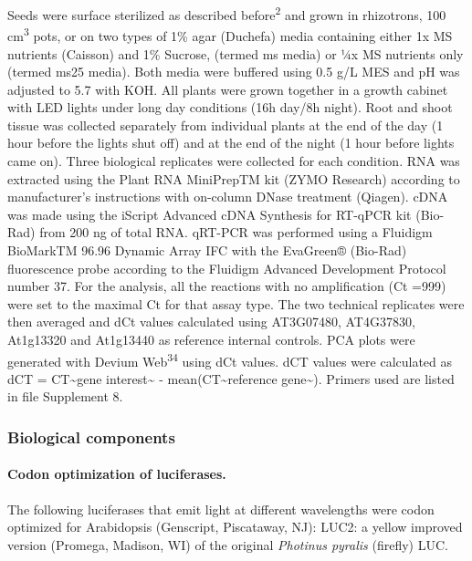 \documentclass[]{article}
\begin{document}
Seeds were surface sterilized as described before\textsuperscript{2} and
grown in rhizotrons, 100 cm\textsuperscript{3} pots, or on two types of
1\% agar (Duchefa) media containing either 1x MS nutrients (Caisson) and
1\% Sucrose, (termed ms media) or ¼x MS nutrients only (termed ms25
media). Both media were buffered using 0.5 g/L MES and pH was adjusted
to 5.7 with KOH. All plants were grown together in a growth cabinet with
LED lights under long day conditions (16h day/8h night). Root and shoot
tissue was collected separately from individual plants at the end of the
day (1 hour before the lights shut off) and at the end of the night (1
hour before lights came on). Three biological replicates were collected
for each condition. RNA was extracted using the Plant RNA MiniPrepTM kit
(ZYMO Research) according to manufacturer's instructions with on-column
DNase treatment (Qiagen). cDNA was made using the iScript Advanced cDNA
Synthesis for RT-qPCR kit (Bio-Rad) from 200 ng of total RNA. qRT-PCR
was performed using a Fluidigm BioMarkTM 96.96 Dynamic Array IFC with
the EvaGreen® (Bio-Rad) fluorescence probe according to the Fluidigm
Advanced Development Protocol number 37. For the analysis, all the
reactions with no amplification (Ct =999) were set to the maximal Ct for
that assay type. The two technical replicates were then averaged and dCt
values calculated using AT3G07480, AT4G37830, At1g13320 and At1g13440 as
reference internal controls. PCA plots were generated with Devium
Web\textsuperscript{34} using dCt values. dCT values were calculated as
dCT = CT\textasciitilde{}gene interest\textasciitilde{} -
mean(CT\textasciitilde{}reference gene\textasciitilde{}). Primers used
are listed in file Supplement 8.

\subsubsection{Biological components}\label{biological-components}

\paragraph{Codon optimization of
luciferases.}\label{codon-optimization-of-luciferases.}

The following luciferases that emit light at different wavelengths were
codon optimized for Arabidopsis (Genscript, Piscataway, NJ): LUC2: a
yellow improved version (Promega, Madison, WI) of the original
\emph{Photinus pyralis} (firefly) LUC.
\end{document}
